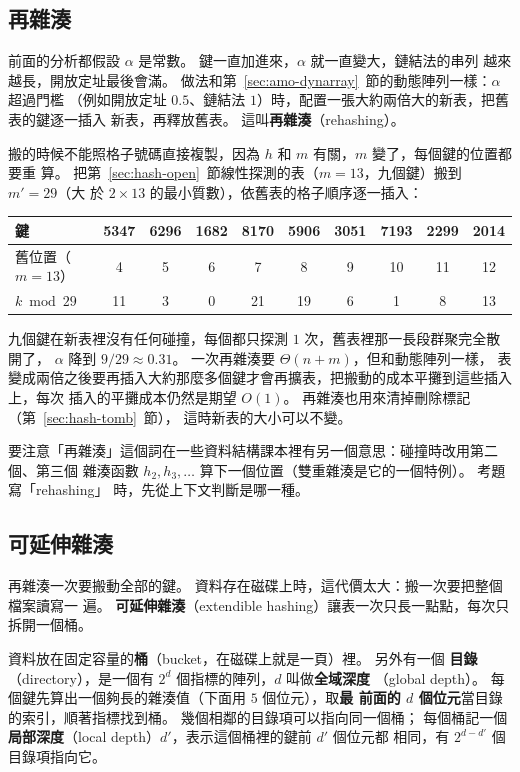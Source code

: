 \subsection{再雜湊}

前面的分析都假設 $\alpha$ 是常數。 鍵一直加進來，$\alpha$ 就一直變大，鏈結法的串列
越來越長，開放定址最後會滿。 做法和第~\ref{sec:amo-dynarray}~節的動態陣列一樣：$\alpha$ 超過門檻
（例如開放定址 $0.5$、鏈結法 $1$）時，配置一張大約兩倍大的新表，把舊表的鍵逐一插入
新表，再釋放舊表。 這叫\textbf{再雜湊}（rehashing）。

搬的時候不能照格子號碼直接複製，因為 $h$ 和 $m$ 有關，$m$ 變了，每個鍵的位置都要重
算。 把第~\ref{sec:hash-open}~節線性探測的表（$m = 13$，九個鍵）搬到 $m' = 29$（大
於 $2 \times 13$ 的最小質數），依舊表的格子順序逐一插入：

\begin{center}
\begin{tabular}{lccccccccc}
\toprule
鍵 & 5347 & 6296 & 1682 & 8170 & 5906 & 3051 & 7193 & 2299 & 2014 \\
\midrule
舊位置（$m = 13$）& 4 & 5 & 6 & 7 & 8 & 9 & 10 & 11 & 12 \\
$k \bmod 29$ & 11 & 3 & 0 & 21 & 19 & 6 & 1 & 8 & 13 \\
\bottomrule
\end{tabular}
\end{center}

九個鍵在新表裡沒有任何碰撞，每個都只探測 $1$ 次，舊表裡那一長段群聚完全散開了，
$\alpha$ 降到 $9/29 \approx 0.31$。 一次再雜湊要 $\Theta(n + m)$，但和動態陣列一樣，
表變成兩倍之後要再插入大約那麼多個鍵才會再擴表，把搬動的成本平攤到這些插入上，每次
插入的平攤成本仍然是期望 $O(1)$。 再雜湊也用來清掉刪除標記（第~\ref{sec:hash-tomb}~節），
這時新表的大小可以不變。

要注意「再雜湊」這個詞在一些資料結構課本裡有另一個意思：碰撞時改用第二個、第三個
雜湊函數 $h_2, h_3, \ldots$ 算下一個位置（雙重雜湊是它的一個特例）。 考題寫「rehashing」
時，先從上下文判斷是哪一種。

\subsection{可延伸雜湊}

再雜湊一次要搬動全部的鍵。 資料存在磁碟上時，這代價太大：搬一次要把整個檔案讀寫一
遍。 \textbf{可延伸雜湊}（extendible hashing）讓表一次只長一點點，每次只拆開一個桶。

資料放在固定容量的\textbf{桶}（bucket，在磁碟上就是一頁）裡。 另外有一個
\textbf{目錄}（directory），是一個有 $2^d$ 個指標的陣列，$d$ 叫做\textbf{全域深度}
（global depth）。 每個鍵先算出一個夠長的雜湊值（下面用 $5$ 個位元），取\textbf{最
前面的 $d$ 個位元}當目錄的索引，順著指標找到桶。 幾個相鄰的目錄項可以指向同一個桶；
每個桶記一個\textbf{局部深度}（local depth）$d'$，表示這個桶裡的鍵前 $d'$ 個位元都
相同，有 $2^{d - d'}$ 個目錄項指向它。

